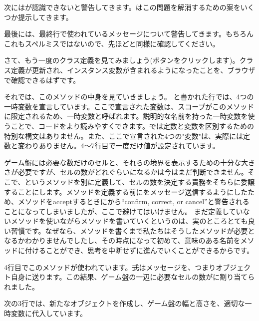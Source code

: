 \documentclass[a4paper,10pt,twoside]{book}
\begin{document}
次に\pharo はが認識できないと警告してきます。\pharo はこの問題を解消するための案をいくつか提示してきます。


最後に\pharo は、最終行で使われているメッセージについて警告してきます。もちろんこれもスペルミスではないので、先ほどと同様に確認してください。


さて、もう一度のクラス定義を見てみましょう(ボタンをクリックします)。クラス定義が更新され、インスタンス変数が含まれるようになったことを、ブラウザで確認できるはずです。

それでは、このメソッドの中身を見ていきましょう。
と書かれた行では、4つの一時変数を宣言しています。ここで宣言された変数は、スコープがこのメソッドに限定されるため、一時変数と呼ばれます。説明的な名前を持った一時変数を使うことで、コードをより読みやすくできます。\st では定数と変数を区別するための特別な構文はありません。また、ここで宣言された4つの"変数"は、実際には定数と変わりありません。4〜7行目で一度だけ値が設定されています。

ゲーム盤には必要な数だけのセルと、それらの境界を表示するための十分な大きさが必要ですが、セルの数がどれぐらいになるかは今はまだ判断できません。そこで、というメソッドを別に定義して、セルの数を決定する責務をそちらに委譲することにします。メソッドを定義する前にをメッセージ送信するようにしたため、メソッドをacceptするときに\pharo から``confirm, correct, or cancel''と警告されることになってしまいましたが、ここで避けてはいけません。
まだ定義していないメソッドを使いながらメソッドを書いていくというのは、実のところとても良い習慣です。なぜなら、メソッドを書くまで私たちはそうしたメソッドが必要となるかわかりませんでしたし、その時点になって初めて、意味のある名前をメソッドに付けることができ、思考を中断せずに進んでいくことができるからです。

4行目でこのメソッドが使われています。\st 式はメッセージを、つまりオブジェクト自身に送ります。この結果、ゲーム盤の一辺に必要なセルの数がに割り当てられました。

次の3行では、新たなオブジェクトを作成し、ゲーム盤の幅と高さを、適切な一時変数に代入しています。
\end{document}
